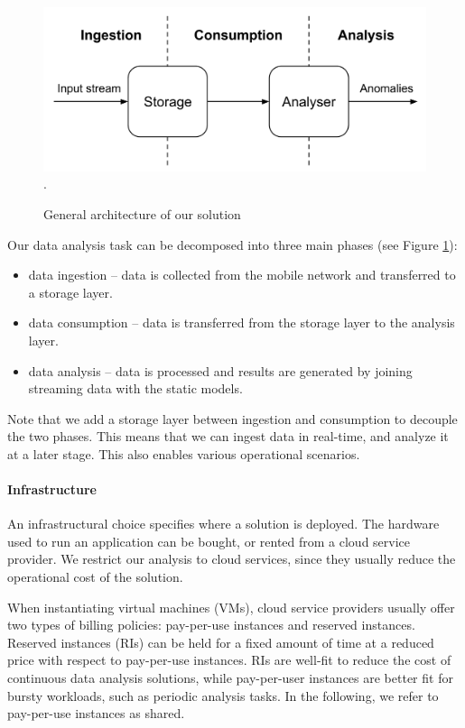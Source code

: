 {\begin{figure}[ht]
  \centering
  \includegraphics[width=.7\textwidth]{img/eval-arch-1}.
    \caption{General architecture of our solution}
    \label{fig:arch_abs}
\end{figure}

Our data analysis task can be decomposed into three main phases (see Figure \ref{fig:arch_abs}):
\begin{itemize}
\item data ingestion -- data is collected from the mobile network and transferred to a storage layer.
\item data consumption -- data is transferred from the storage layer to the analysis layer.
\item data analysis -- data is processed and results are generated by joining streaming data with the static models.
\end{itemize}

Note that we add a storage layer between ingestion and consumption to decouple the two phases. This means that we can ingest data in real-time, and analyze it at a later stage. This also enables various operational scenarios.
\paragraph{Infrastructure}
An infrastructural choice specifies where a solution is deployed. The hardware used to run an application can be bought, or rented from a cloud service provider. We restrict our analysis to cloud services, since they usually reduce the operational cost of the solution.

When instantiating virtual machines (VMs), cloud service providers usually offer two types of billing policies: pay-per-use instances and reserved instances. Reserved instances (RIs) can be held for a fixed amount of time at a reduced price with respect to pay-per-use instances. RIs are well-fit to reduce the cost of continuous data analysis solutions, while pay-per-user instances are better fit for bursty workloads, such as periodic analysis tasks. In the following, we refer to pay-per-use instances as shared.

}
